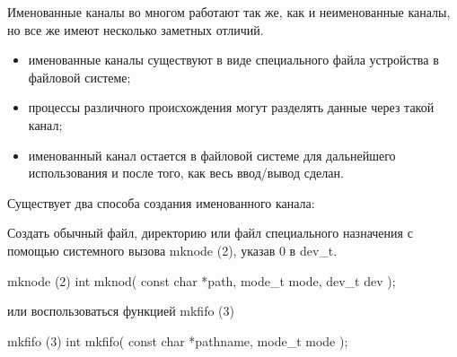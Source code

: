Именованные каналы во многом работают так же, как и неименованные каналы, но все же имеют несколько заметных отличий.

\begin{itemize}
	\item именованные каналы существуют в виде специального файла устройства в файловой системе;
	\item процессы различного происхождения могут разделять данные через такой канал;
	\item именованный канал остается в файловой системе для дальнейшего использования и после того, как весь ввод/вывод сделан.
\end{itemize}


Существует два способа создания именованного канала:

Создать обычный файл, директорию или файл специального назначения с помощью системного вызова mknode (2), указав 0 в dev\_t.

\begin{CCode}{mknode (2)}
	int mknod(
		const char *path, 
		mode_t mode, 
		dev_t dev
	); \end{CCode}

или воспользоваться функцией mkfifo (3)

\begin{CCode}{mkfifo (3)}
	int mkfifo(
		const char *pathname, 
		mode_t mode
	); \end{CCode}
